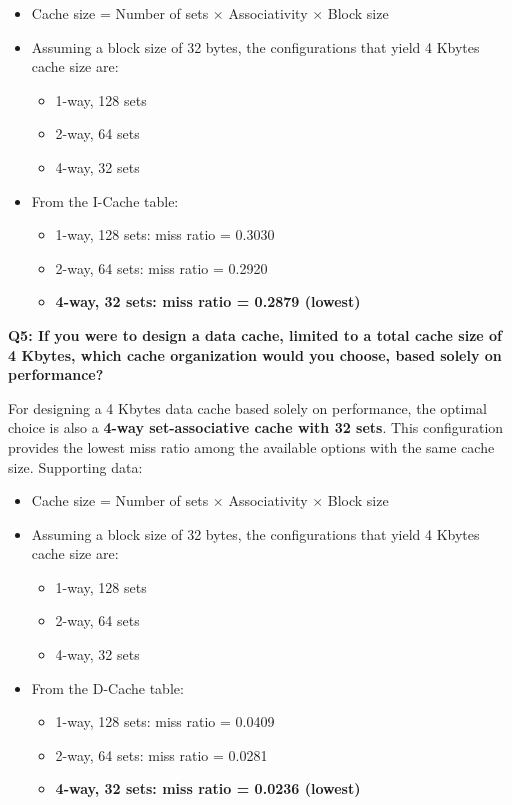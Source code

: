 \documentclass{article}
\begin{document}
\begin{itemize}
	\item Cache size = Number of sets $\times$ Associativity $\times$ Block size
	\item Assuming a block size of 32 bytes, the configurations that yield 4 Kbytes cache size are:
	\begin{itemize}
		\item 1-way, 128 sets
		\item 2-way, 64 sets
		\item 4-way, 32 sets
	\end{itemize}
	\item From the I-Cache table:
	\begin{itemize}
		\item 1-way, 128 sets: miss ratio = 0.3030
		\item 2-way, 64 sets: miss ratio = 0.2920
		\item \textbf{4-way, 32 sets: miss ratio = 0.2879 (lowest)}
	\end{itemize}
\end{itemize}

\textbf{Q5: If you were to design a data cache, limited to a total cache size of 4 Kbytes, which cache organization would you choose, based solely on performance?}

For designing a 4 Kbytes data cache based solely on performance, the optimal choice is also a \textbf{4-way set-associative cache with 32 sets}. This configuration provides the lowest miss ratio among the available options with the same cache size. Supporting data:

\begin{itemize}
	\item Cache size = Number of sets $\times$ Associativity $\times$ Block size
	\item Assuming a block size of 32 bytes, the configurations that yield 4 Kbytes cache size are:
	\begin{itemize}
		\item 1-way, 128 sets
		\item 2-way, 64 sets
		\item 4-way, 32 sets
	\end{itemize}
	\item From the D-Cache table:
	\begin{itemize}
		\item 1-way, 128 sets: miss ratio = 0.0409
		\item 2-way, 64 sets: miss ratio = 0.0281
		\item \textbf{4-way, 32 sets: miss ratio = 0.0236 (lowest)}
	\end{itemize}
\end{itemize}
\end{document}
